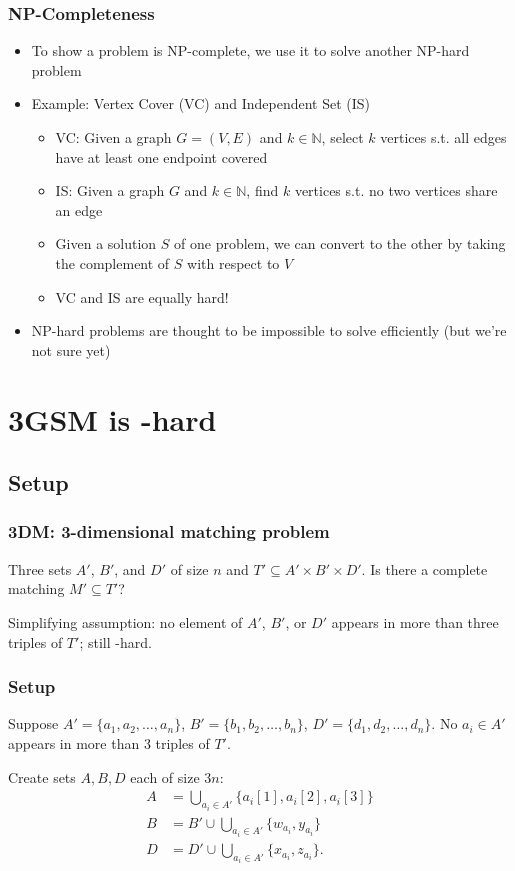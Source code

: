\documentclass[mathserif,serif]{beamer}
\begin{document}
\begin{frame}
  \frametitle{NP-Completeness}
  \begin{itemize}
  \item To show a problem is  NP-complete, we use it to solve another NP-hard problem
  \item Example: Vertex Cover (VC) and Independent Set (IS)
    \begin{itemize}
    \item VC: Given a graph $G = (V, E)$ and $k \in \mathbb{N}$, select $k$ vertices s.t. all edges have at least one endpoint covered
    \item IS: Given a graph $G$ and $k \in \mathbb{N}$, find $k$ vertices s.t. no two vertices share an edge
    \item Given a solution $S$ of one problem, we can convert to the other by taking the complement of $S$ with respect to $V$
    \item VC and IS are equally hard!
    \end{itemize}
  \item NP-hard problems are thought to be impossible to solve efficiently (but we're not sure yet)
  \end{itemize}
\end{frame}



\section{3GSM is \NP-hard}

\subsection{Setup}

\begin{frame}
	\frametitle{3DM: 3-dimensional matching problem}

	Three sets $A'$, $B'$, and $D'$ of size $n$ and $T' \subseteq A' \times B' \times D'$.  Is there a complete
	matching $M' \subseteq T'$?

	Simplifying assumption: no element of $A'$, $B'$, or $D'$ appears in more than three triples of $T'$; still \NP-hard.
\end{frame}

\begin{frame}
	\frametitle{Setup}

	Suppose $A' = \{a_1, a_2, \dots, a_n\}$, $B' = \{b_1, b_2, \dots, b_n\}$, $D' = \{d_1, d_2, \dots, d_n\}$.  No
	$a_i \in A'$ appears in more than 3 triples of $T'$.

	Create sets $A, B, D$ each of size $3n$:
	\begin{align*}
	A &= \bigcup_{a_i \in A'} \{a_i[1], a_i[2], a_i[3]\} \\
	B &= B' \cup \bigcup_{a_i \in A'} \{w_{a_i}, y_{a_i}\} \\
	D &= D' \cup \bigcup_{a_i \in A'} \{x_{a_i}, z_{a_i}\}.
	\end{align*}
\end{frame}
\end{document}
